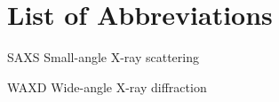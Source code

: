 \chapter*{List of Abbreviations}
\begin{abbrv}
	\item[SAXS]	Small-angle X-ray scattering
	\item[WAXD] Wide-angle X-ray diffraction


	
\end{abbrv}
\cleardoublepage